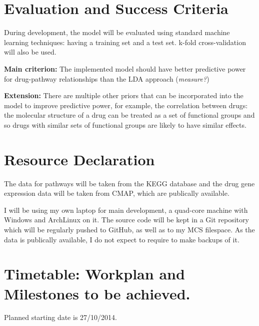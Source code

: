 \documentclass[12pt,a4]{article}
\begin{document}
\section*{Evaluation and Success Criteria}
During development, the model will be evaluated using standard machine learning techniques: having a training set and a test set. k-fold cross-validation will also be used.

{\bf Main criterion:} The implemented model should have better predictive power for drug-pathway relationships than the LDA approach ({\em measure?})

{\bf Extension:} There are multiple other priors that can be incorporated into the model to improve predictive power, for example, the correlation between drugs: the molecular structure of a drug can be treated as a set of functional groups and so drugs with similar sets of functional groups are likely to have similar effects.

\section*{Resource Declaration}

The data for pathways will be taken from the KEGG database and the drug gene expression data will be taken from CMAP, which are publically available.

I will be using my own laptop for main development, a quad-core machine with Windows and ArchLinux on it. The source code will be kept in a Git repository which will be regularly pushed to GitHub, as well as to my MCS filespace. As the data is publically available, I do not expect to require to make backups of it.

\section*{Timetable: Workplan and Milestones to be achieved.}

Planned starting date is 27/10/2014.
\end{document}
